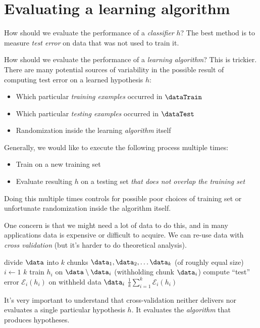 \section{Evaluating a learning algorithm}
How should we evaluate the performance of a {\em classifier} $h$?   The best
method is to measure {\em test error} on data that was not used to
train it.

How should we evaluate the performance of a {\em learning algorithm}?
This is trickier.  There are many potential sources of variability in
the possible result of computing test error on a learned hypothesis $h$:
\begin{itemize}
  \item Which particular {\em training examples} occurred in $\dataTrain$
  \item Which particular {\em testing examples} occurred in $\dataTest$
  \item Randomization inside the learning {\em algorithm} itself
\end{itemize}
Generally, we would like to execute the following process multiple
times:
\begin{itemize}
  \item Train on a new training set
  \item Evaluate resulting $h$ on a testing set {\em that does not
            overlap the training set}
\end{itemize}
Doing this multiple times controls for possible poor choices of
training set or unfortunate randomization inside the algorithm itself.

One concern is that we might need a lot of data to do this, and in
many applications data is expensive or difficult to acquire. We can
re-use data with {\em{cross validation}} (but it's harder to do theoretical
analysis).  \\
\begin{codebox}
  \li divide $\data$ into $k$ chunks $\data_1, \data_2, \ldots \data_k$ (of roughly equal size)
  \li \For $i \gets 1$ \To $k$
  \li   \Do
  train $h_i$ on $\data \setminus \data_i$ (withholding chunk $\data_i$)
  \li     compute ``test'' error $\mathcal{E}_i (h_i)$ on withheld data $\data_i$
  \End
  \li \Return $\frac{1}{k} \sum_{i=1}^k \mathcal{E}_i (h_i)$
\end{codebox}

It's very important to understand that cross-validation neither
delivers nor evaluates a single particular hypothesis $h$.  It
evaluates the {\em algorithm} that produces hypotheses.


